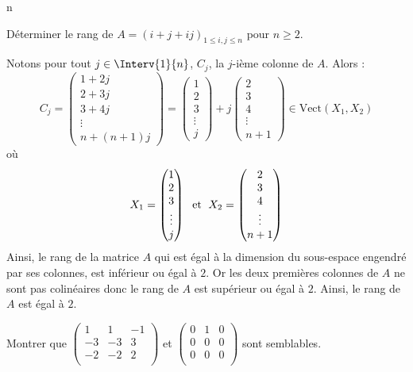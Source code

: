 n\documentclass[a4paper,10pt]{report}
\begin{document}
\begin{Exercice}{} Déterminer le rang de $A=(i+j+ij)_{1\leq i,j\leq n}$ pour $n \geq 2$.
\end{Exercice} 

\corr Notons pour tout $j \in \Interv{1}{n}$, $C_j$, la $j$-ième colonne de $A$. Alors :
$$ C_j = \begin{pmatrix}
1 + 2j \\
2 + 3j \\
3 + 4j \\
\vdots \\
n + (n+1)j
\end{pmatrix} = \begin{pmatrix}
1  \\
2  \\
3  \\
\vdots \\
 j
\end{pmatrix} + j \begin{pmatrix}
2 \\
3 \\
4\\
\vdots \\
n+1
\end{pmatrix} \in \textrm{Vect}(X_1,X_2)$$
où 
$$ X_1= \begin{pmatrix}
1  \\
2  \\
3  \\
\vdots \\
 j
\end{pmatrix} \; \hbox{ et } \; X_2 = \begin{pmatrix}
2 \\
3 \\
4\\
\vdots \\
n+1
\end{pmatrix}$$
Ainsi, le rang de la matrice $A$ qui est égal à la dimension du sous-espace engendré par ses colonnes, est inférieur ou égal à $2$. Or les deux premières colonnes de $A$ ne sont pas colinéaires donc le rang de $A$ est supérieur ou égal à $2$. Ainsi, le rang de $A$ est égal à $2$.

\begin{Exercice}{} Montrer que $\begin{pmatrix}
1 & 1 & -1 \\
-3 & -3 & 3 \\
-2 & -2 & 2 \\
\end{pmatrix}$ et $\begin{pmatrix}
0 & 1 & 0 \\
0 & 0 & 0 \\
0 & 0 & 0 \\
\end{pmatrix}$ sont semblables.
\end{Exercice}
\end{document}
